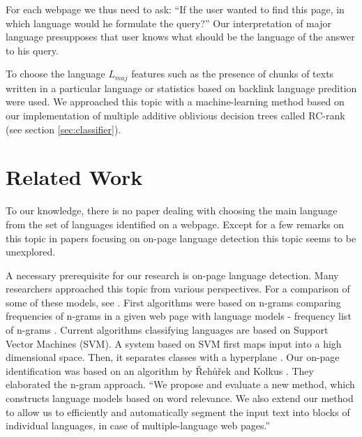 \documentclass{acm_proc_article-sp}
\begin{document}
  For each webpage we thus need to ask: “If the user wanted to find this page, in which language would he formulate the query?” 
  Our interpretation of major language presupposes that user knows what should be the language of the answer to his query.

  To choose the language $L_{maj}$ features such as the presence of chunks of texts written in a particular language or statistics based on 
  backlink language predition were used. 
  We approached this topic with a machine-learning method based on our implementation of multiple additive oblivious decision trees called RC-rank (see section \ref{sec:classifier}).

\section{Related Work}

  To our knowledge, there is no paper dealing with choosing the main language from the set
  of languages identified on a webpage. Except for a few remarks on this topic in papers 
  focusing on on-page language detection this topic seems to be unexplored. 
  
  A necessary prerequisite for our research is on-page language detection. Many researchers approached this topic
  from various perspectives. For a comparison of some of these models, see \cite{Baldwin:shortlong}. 
  First algorithms were based on n-grams comparing frequencies of n-grams in a given web page with 
  language models - frequency list of n-grams \cite{trenkle:ngram}. Current algorithms classifying languages 
  are based on Support Vector Machines (SVM). A system based on SVM first maps input into a high dimensional space. 
  Then, it separates classes with a hyperplane \cite{Campbell:supportvector, Lodhi:textclass}.
  Our on-page identification was based on an algorithm by Řehůřek and Kolkus \cite{Rehurek:languageidentification}.  They elaborated the n-gram approach. 
  “We propose and evaluate a new method, which constructs language models based on word relevance. We also 
  extend our method to allow us to efficiently and automatically segment the input text into blocks of individual 
  languages, in case of multiple-language web pages.” \cite{Rehurek:languageidentification}
  
\end{document}
